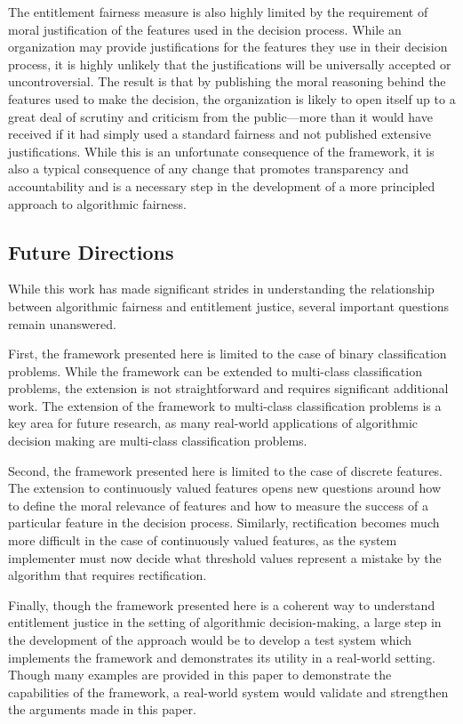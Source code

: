 The entitlement fairness measure is also highly limited by the requirement of 
moral justification of the features used in the decision process. While 
an organization may provide justifications for the features they use in their
decision process, it is highly unlikely that the justifications will be
universally accepted or uncontroversial. The result is that by publishing the 
moral reasoning behind the features used to make the decision, the organization
is likely to open itself up to a great deal of scrutiny and criticism from the
public—more than it would have received if it had simply used a standard fairness
and not published extensive justifications. While this is an unfortunate 
consequence of the framework, it is also a typical consequence of any change
that promotes transparency and accountability and is a necessary step in the
development of a more principled approach to algorithmic fairness.

\subsection{Future Directions}

While this work has made significant strides in understanding the relationship
between algorithmic fairness and entitlement justice, several important
questions remain unanswered. 

First, the framework presented here is limited to the case of binary
classification problems. While the framework can be extended to multi-class
classification problems, the extension is not straightforward and requires
significant additional work. The extension of the framework to multi-class
classification problems is a key area for future research, as many real-world
applications of algorithmic decision making are multi-class classification
problems.

Second, the framework presented here is limited to the case of discrete
features. The extension to continuously valued features opens new questions
around how to define the moral relevance of features and how to measure the 
success of a particular feature in the decision process. Similarly,
rectification becomes much more difficult in the case of continuously valued
features, as the system implementer must now decide what threshold values
represent a mistake by the algorithm that requires rectification.

Finally, though the framework presented here is a coherent way to understand
entitlement justice in the setting of algorithmic decision-making, a large
step in the development of the approach would be to develop a test system which
implements the framework and demonstrates its utility in a real-world setting.
Though many examples are provided in this paper to demonstrate the capabilities
of the framework, a real-world system would validate and strengthen the 
arguments made in this paper.
